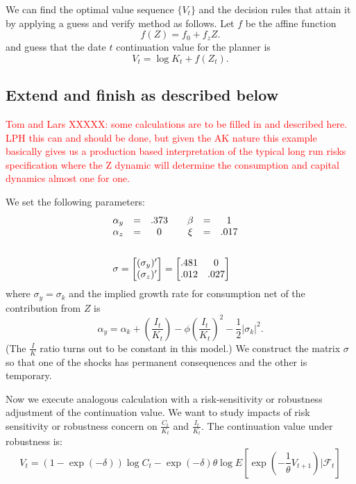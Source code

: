 \documentclass[12pt]{article}
\begin{document}
 
 We can find the optimal value sequence $\{V_t\}$ and the  decision rules that attain it by applying  a guess and verify method as follows.
Let  $f$  be the affine function
\[ f(Z)= f_0 + f_z Z. \]
and guess that the  date $t$ continuation value for the planner is
\[
V_t = \log K_t + f(Z_t).
\]

\subsection{Extend and finish as described below}


\textcolor{red}{Tom and Lars XXXXX: some calculations are to be filled in and described here.  LPH this can and should be done, but given the AK nature this example basically gives us a production based interpretation of the typical long run risks specification where the Z dynamic will determine the consumption and capital dynamics almost one for one.  }

We set the following parameters:
\begin{align}  \label{pdivparameters}
& \begin{matrix}
{\alpha}_y  & = & .373 & & {\beta} &= &1 \cr
{ \alpha}_z  &= & 0 &  & { \xi} & = & .017 \end{matrix} \cr \cr
& \sigma = \begin{bmatrix}
(\sigma_y)' \cr (\sigma_z)' \end{bmatrix}  =  \begin{bmatrix} .481 & 0 \cr  .012 & .027 \end{bmatrix}
\end{align}
where $\sigma_y = \sigma_k$ and the implied growth rate for consumption net of the contribution from $Z$ is
\[
{\alpha}_y = \alpha_k + \left(\frac {I_t}{K_t}\right)  - \phi \left( \frac {I_t}{K_t} \right)^2
- {\frac 1 2} | \sigma_k|^2.
\]
(The $\frac I K$ ratio turns out to be constant in this model.)
We construct the matrix $\sigma$ so that one of the shocks has permanent consequences and the other is temporary.

Now we execute analogous  calculation with a risk-sensitivity or robustness adjustment of  the continuation value.  We want to study impacts
of  risk sensitivity or robustness concern  on ${\frac {C_t}{K_t}}$ and ${\frac {I_t}{K_t}}$.
The continuation value under robustness is:
\[
V_t = (1 - \exp(-\delta)) \log C_t - \exp(-\delta) \theta \log  E\left[ \exp\left( - {\frac 1 \theta} V_{t+1} \right) \vert {\mathcal F}_t \right]
\]
\end{document}
